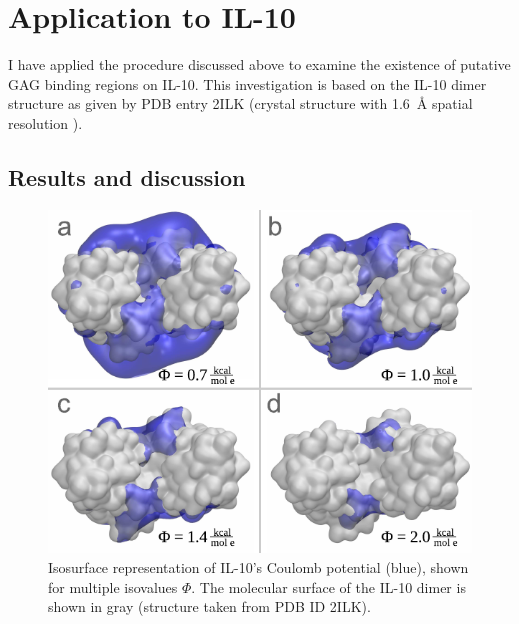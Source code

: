 

\section{Application to IL-10}

I have applied the procedure discussed above to examine the existence of
putative GAG binding regions on IL-10. This investigation is based on the IL-10
dimer structure as given by PDB entry 2ILK (crystal structure with
\SI{1.6}{\angstrom} spatial resolution \cite{Zdanov1996}).

\subsection{Results and discussion}
\label{bspred:il10}

\begin{figure}
\centering
\includegraphics[width=1.0\textwidth]{gfx/bspred/il10_top_coulomb_isosurfaces_different_values_03_ds.pdf}
\caption[]{
Isosurface representation of IL-10's Coulomb potential (blue), shown for
multiple isovalues $\Phi$. The molecular surface of the IL-10 dimer is
shown in gray (structure taken from PDB ID 2ILK).
}
\label{fig:bspred:il10_multi_iso}
\end{figure}

